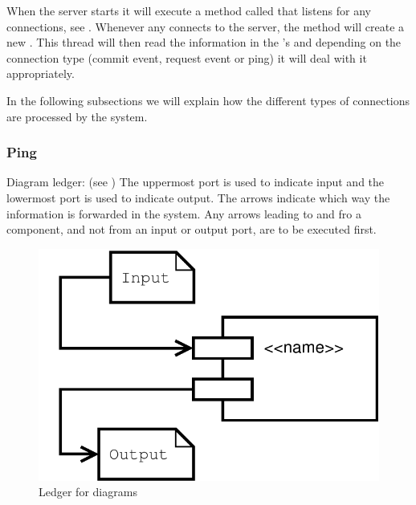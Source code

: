 When the server starts it will execute a method called  that listens for any connections, see .
Whenever any  connects to the server, the  method will create a new .
This thread will then read the information in the 's  and depending on the connection type (commit event, request event or ping) it will deal with it appropriately.



In the following subsections we will explain how the different types of connections are processed by the system.


\subsubsection{Ping}
\label{sec:IOPing}

Diagram ledger: (see )\newline
The uppermost port is used to indicate input and the lowermost port is used to indicate output. The arrows indicate which way the information is forwarded in the system. Any arrows leading to and fro a component, and not from an input or output port, are to be executed first.	\newline
\begin{figure}[H]
	\centering
		\includegraphics[scale=0.40]{images/ledger.pdf} %
	\caption{Ledger for diagrams}
	\label{fig:IOLedger}
\end{figure}

